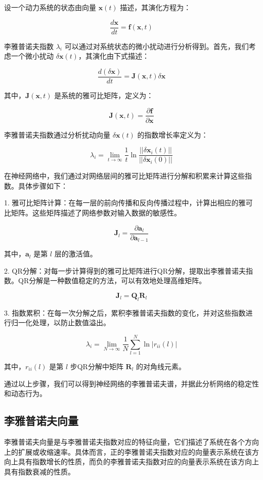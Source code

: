 \documentclass[12pt,a4paper]{amsart}
\begin{document}
设一个动力系统的状态由向量 \(\mathbf{x}(t)\) 描述，其演化方程为：

\[ \frac{d\mathbf{x}}{dt} = \mathbf{f}(\mathbf{x}, t) \]

李雅普诺夫指数 \(\lambda_i\) 可以通过对系统状态的微小扰动进行分析得到。首先，我们考虑一个微小扰动 \(\delta \mathbf{x}(t)\)，其演化由下式描述：

\[ \frac{d (\delta \mathbf{x})}{dt} = \mathbf{J}(\mathbf{x}, t) \delta \mathbf{x} \]

其中，\(\mathbf{J}(\mathbf{x}, t)\) 是系统的雅可比矩阵，定义为：

\[ \mathbf{J}(\mathbf{x}, t) = \frac{\partial \mathbf{f}}{\partial \mathbf{x}} \]

李雅普诺夫指数通过分析扰动向量 \(\delta \mathbf{x}(t)\) 的指数增长率定义为：

\[ \lambda_i = \lim_{t \to \infty} \frac{1}{t} \ln \frac{||\delta \mathbf{x}_i(t)||}{||\delta \mathbf{x}_i(0)||} \]

在神经网络中，我们通过对网络层间的雅可比矩阵进行分解和积累来计算这些指数。具体步骤如下：

1. 雅可比矩阵计算：在每一层的前向传播和反向传播过程中，计算出相应的雅可比矩阵。这些矩阵描述了网络参数对输入数据的敏感性。

\[ \mathbf{J}_l = \frac{\partial \mathbf{a}_l}{\partial \mathbf{a}_{l-1}} \]

其中，\(\mathbf{a}_l\) 是第 \(l\) 层的激活值。

2. QR分解：对每一步计算得到的雅可比矩阵进行QR分解，提取出李雅普诺夫指数。QR分解是一种数值稳定的方法，可以有效地处理高维矩阵。

\[ \mathbf{J}_l = \mathbf{Q}_l \mathbf{R}_l \]

3. 指数累积：在每一次分解之后，累积李雅普诺夫指数的变化，并对这些指数进行归一化处理，以防止数值溢出。

\[ \lambda_i = \lim_{N \to \infty} \frac{1}{N} \sum_{l=1}^N \ln |r_{ii}(l)| \]

其中，\(r_{ii}(l)\) 是第 \(l\) 步QR分解中矩阵 \(\mathbf{R}_l\) 的对角线元素。

通过以上步骤，我们可以得到神经网络的李雅普诺夫谱，并据此分析网络的稳定性和动态行为。

\subsection{李雅普诺夫向量}

李雅普诺夫向量是与李雅普诺夫指数对应的特征向量，它们描述了系统在各个方向上的扩展或收缩速率。具体而言，正的李雅普诺夫指数对应的向量表示系统在该方向上具有指数增长的性质，而负的李雅普诺夫指数对应的向量表示系统在该方向上具有指数衰减的性质。
\end{document}
